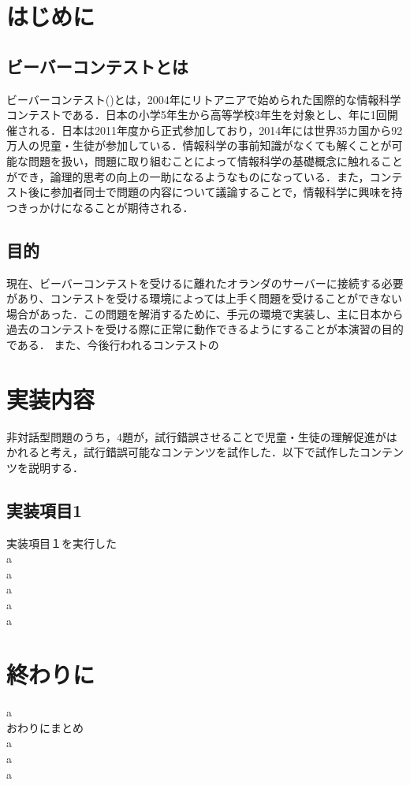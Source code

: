\documentclass[a4paper]{jarticle}
\begin{document}
\maketitle
\begin{multicols}{2}
\setcounter{page}{1}

\section{はじめに}

\subsection{ビーバーコンテストとは}
ビーバーコンテスト(\cite{bebras-contest, bebras-pdf})とは，2004年にリトアニアで始められた国際的な情報科学コンテストである．日本の小学5年生から高等学校3年生を対象とし、年に1回開催される．日本は2011年度から正式参加しており，2014年には世界35カ国から92万人の児童・生徒が参加している．情報科学の事前知識がなくても解くことが可能な問題を扱い，問題に取り組むことによって情報科学の基礎概念に触れることができ，論理的思考の向上の一助になるようなものになっている．また，コンテスト後に参加者同士で問題の内容について議論することで，情報科学に興味を持つきっかけになることが期待される．

\subsection{目的}
現在、ビーバーコンテストを受けるに離れたオランダのサーバーに接続する必要があり、コンテストを受ける環境によっては上手く問題を受けることができない場合があった．この問題を解消するために、手元の環境で実装し、主に日本から過去のコンテストを受ける際に正常に動作できるようにすることが本演習の目的である．
また、今後行われるコンテストの

\section{実装内容}
非対話型問題のうち，4題が，試行錯誤させることで児童・生徒の理解促進がはかれると考え，試行錯誤可能なコンテンツを試作した．以下で試作したコンテンツを説明する．

\subsection{実装項目1}
実装項目１を実行した\\a\\a\\a\\a\\a


\section{終わりに}
a\\おわりにまとめ
\\a
\\a
\\a

\end{multicols}
\end{document}
